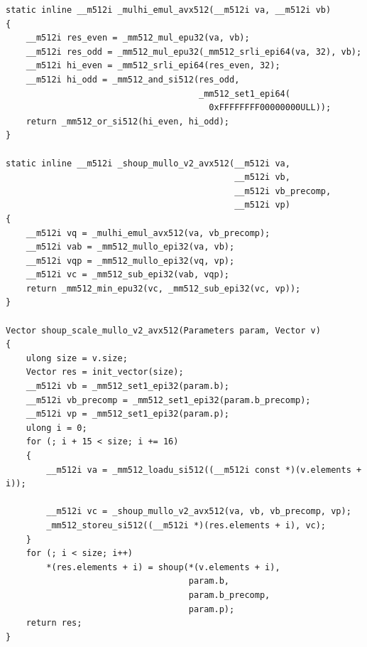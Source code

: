 \documentclass{article}
\begin{document}
\begin{lstlisting}[caption = Variant 3 (AVX512)]
static inline __m512i _mulhi_emul_avx512(__m512i va, __m512i vb)
{
    __m512i res_even = _mm512_mul_epu32(va, vb);
    __m512i res_odd = _mm512_mul_epu32(_mm512_srli_epi64(va, 32), vb);
    __m512i hi_even = _mm512_srli_epi64(res_even, 32);
    __m512i hi_odd = _mm512_and_si512(res_odd,
                                      _mm512_set1_epi64(
                                        0xFFFFFFFF00000000ULL));
    return _mm512_or_si512(hi_even, hi_odd);
}

static inline __m512i _shoup_mullo_v2_avx512(__m512i va,
                                             __m512i vb,
                                             __m512i vb_precomp,
                                             __m512i vp)
{
    __m512i vq = _mulhi_emul_avx512(va, vb_precomp);
    __m512i vab = _mm512_mullo_epi32(va, vb);
    __m512i vqp = _mm512_mullo_epi32(vq, vp);
    __m512i vc = _mm512_sub_epi32(vab, vqp);
    return _mm512_min_epu32(vc, _mm512_sub_epi32(vc, vp));
}

Vector shoup_scale_mullo_v2_avx512(Parameters param, Vector v)
{
    ulong size = v.size;
    Vector res = init_vector(size);
    __m512i vb = _mm512_set1_epi32(param.b);
    __m512i vb_precomp = _mm512_set1_epi32(param.b_precomp);
    __m512i vp = _mm512_set1_epi32(param.p);
    ulong i = 0;
    for (; i + 15 < size; i += 16)
    {
        __m512i va = _mm512_loadu_si512((__m512i const *)(v.elements + i));

        __m512i vc = _shoup_mullo_v2_avx512(va, vb, vb_precomp, vp);
        _mm512_storeu_si512((__m512i *)(res.elements + i), vc);
    }
    for (; i < size; i++)
        *(res.elements + i) = shoup(*(v.elements + i),
                                    param.b,
                                    param.b_precomp,
                                    param.p);
    return res;
}
\end{lstlisting}


\newpage
\end{document}
